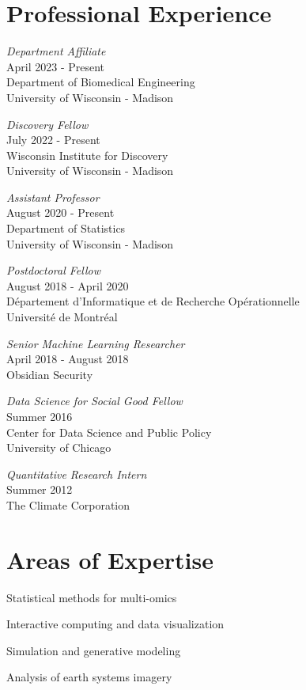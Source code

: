 \documentclass[letterpaper]{article}
\renewenvironment{itemize}{
  \begin{list}{}{
    \setlength{\leftmargin}{1.5em}
  }
}{
  \end{list}
}
\begin{document}
\section*{Professional Experience}
\begin{itemize}
\item \textit{Department Affiliate}\\
April 2023 - Present \\
Department of Biomedical Engineering \\
University of Wisconsin - Madison

\item \textit{Discovery Fellow} \\
July 2022 - Present \\
Wisconsin Institute for Discovery \\
University of Wisconsin - Madison

\item \textit{Assistant Professor}\\
August 2020 - Present \\
Department of Statistics \\
University of Wisconsin - Madison

\item \textit{Postdoctoral Fellow}\\
August 2018 - April 2020 \\
D\'epartement d'Informatique et de Recherche Op\'erationnelle \\
Universit\'e de Montr\'eal

\item \textit{Senior Machine Learning Researcher} \\
  April 2018 - August 2018 \\
  Obsidian Security
\item \textit{Data Science for Social Good Fellow} \\
  Summer 2016 \\
  Center for Data Science and Public Policy\\
  University of Chicago
\item \textit{Quantitative Research Intern} \\
  Summer 2012 \\
  The Climate Corporation
\end{itemize}

\section*{Areas of Expertise}
\begin{itemize}
  \item Statistical methods for multi-omics
  \item Interactive computing and data visualization
  \item Simulation and generative modeling
  \item Analysis of earth systems imagery
\end{itemize}
\end{document}

